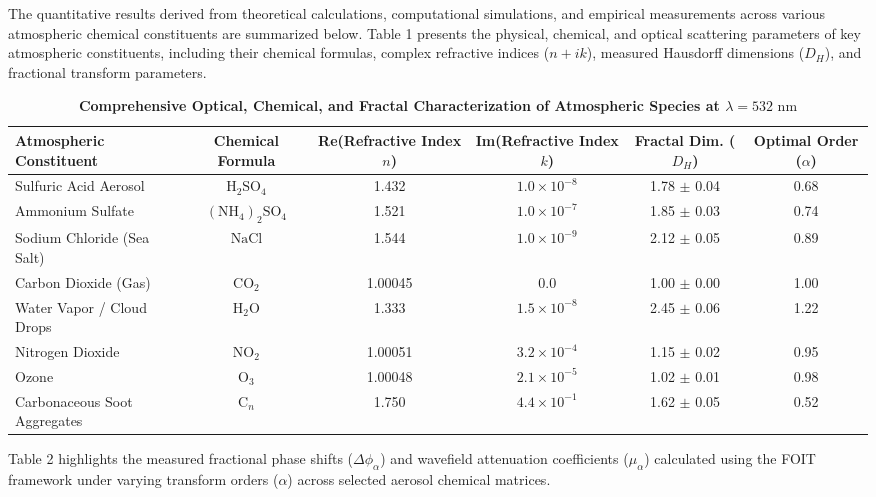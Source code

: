 \documentclass{article}
\begin{document}
The quantitative results derived from theoretical calculations, computational simulations, and empirical measurements across various atmospheric chemical constituents are summarized below. Table 1 presents the physical, chemical, and optical scattering parameters of key atmospheric constituents, including their chemical formulas, complex refractive indices ($n + ik$), measured Hausdorff dimensions ($D_H$), and fractional transform parameters.

\begin{table}[h!]
\centering
\caption{\textbf{Comprehensive Optical, Chemical, and Fractal Characterization of Atmospheric Species at $\lambda = 532\text{ nm}$}}
\vspace{0.3cm}
\begin{tabular}{|l|c|c|c|c|c|}
\hline
\textbf{Atmospheric Constituent} & \textbf{Chemical Formula} & \textbf{Re(Refractive Index $n$)} & \textbf{Im(Refractive Index $k$)} & \textbf{Fractal Dim. ($D_H$)} & \textbf{Optimal Order ($\alpha$)} \\ \hline
Sulfuric Acid Aerosol & $\text{H}_2\text{SO}_4$ & 1.432 & $1.0 \times 10^{-8}$ & 1.78 $\pm$ 0.04 & 0.68 \\ \hline
Ammonium Sulfate & $(\text{NH}_4)_2\text{SO}_4$ & 1.521 & $1.0 \times 10^{-7}$ & 1.85 $\pm$ 0.03 & 0.74 \\ \hline
Sodium Chloride (Sea Salt) & $\text{NaCl}$ & 1.544 & $1.0 \times 10^{-9}$ & 2.12 $\pm$ 0.05 & 0.89 \\ \hline
Carbon Dioxide (Gas) & $\text{CO}_2$ & 1.00045 & $0.0$ & 1.00 $\pm$ 0.00 & 1.00 \\ \hline
Water Vapor / Cloud Drops & $\text{H}_2\text{O}$ & 1.333 & $1.5 \times 10^{-8}$ & 2.45 $\pm$ 0.06 & 1.22 \\ \hline
Nitrogen Dioxide & $\text{NO}_2$ & 1.00051 & $3.2 \times 10^{-4}$ & 1.15 $\pm$ 0.02 & 0.95 \\ \hline
Ozone & $\text{O}_3$ & 1.00048 & $2.1 \times 10^{-5}$ & 1.02 $\pm$ 0.01 & 0.98 \\ \hline
Carbonaceous Soot Aggregates & $\text{C}_n$ & 1.750 & $4.4 \times 10^{-1}$ & 1.62 $\pm$ 0.05 & 0.52 \\ \hline
\end{tabular}
\end{table}

Table 2 highlights the measured fractional phase shifts ($\Delta \phi_{\alpha}$) and wavefield attenuation coefficients ($\mu_{\alpha}$) calculated using the FOIT framework under varying transform orders ($\alpha$) across selected aerosol chemical matrices.
\end{document}
